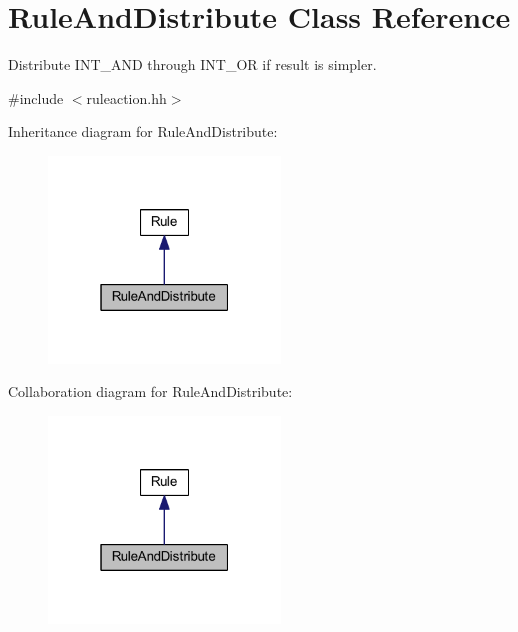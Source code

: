 \hypertarget{class_rule_and_distribute}{}\section{Rule\+And\+Distribute Class Reference}
\label{class_rule_and_distribute}


Distribute I\+N\+T\+\_\+\+A\+ND through I\+N\+T\+\_\+\+OR if result is simpler.  




{\ttfamily \#include $<$ruleaction.\+hh$>$}



Inheritance diagram for Rule\+And\+Distribute\+:
\nopagebreak
\begin{figure}[H]
\begin{center}
\leavevmode
\includegraphics[width=175pt]{class_rule_and_distribute__inherit__graph}
\end{center}
\end{figure}


Collaboration diagram for Rule\+And\+Distribute\+:
\nopagebreak
\begin{figure}[H]
\begin{center}
\leavevmode
\includegraphics[width=175pt]{class_rule_and_distribute__coll__graph}
\end{center}
\end{figure}
